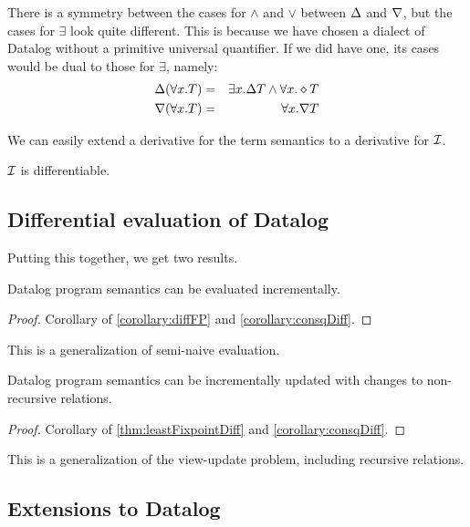 There is a symmetry between the cases for $\wedge$ and $\vee$ between $\Delta$
and $\nabla$, but the cases for $\exists$ look quite different. 
This is because we have chosen a dialect of Datalog without a primitive universal quantifier.
If we did have one, its cases would be dual to those for $\exists$, namely:
\begin{eqnarray*}
\Delta(\forall x.T) & = & \exists x. \Delta T \wedge \forall x. \diamond T\\
\nabla(\forall x.T) & = & \forall x. \nabla T
\end{eqnarray*}

We can easily extend a derivative for the term semantics to a derivative for $\mathcal{I}$.

\begin{corollary}
\label{corollary:consqDiff}
  $\mathcal{I}$ is differentiable.
\end{corollary}

\subsection{Differential evaluation of Datalog}

Putting this together, we get two results.

\begin{thm}
\label{thm:diffEval}
  Datalog program semantics can be evaluated incrementally.
\end{thm}
\begin{proof}
  Corollary of \cref{corollary:diffFP} and \cref{corollary:consqDiff}.
\end{proof}

This is a generalization of semi-naive evaluation.

\begin{thm}
\label{thm:diffUpdate}
  Datalog program semantics can be incrementally updated with changes to non-recursive relations.
\end{thm}
\begin{proof}
  Corollary of \cref{thm:leastFixpointDiff} and \cref{corollary:consqDiff}.
\end{proof}

This is a generalization of the view-update problem, including recursive relations.

\subsection{Extensions to Datalog}

